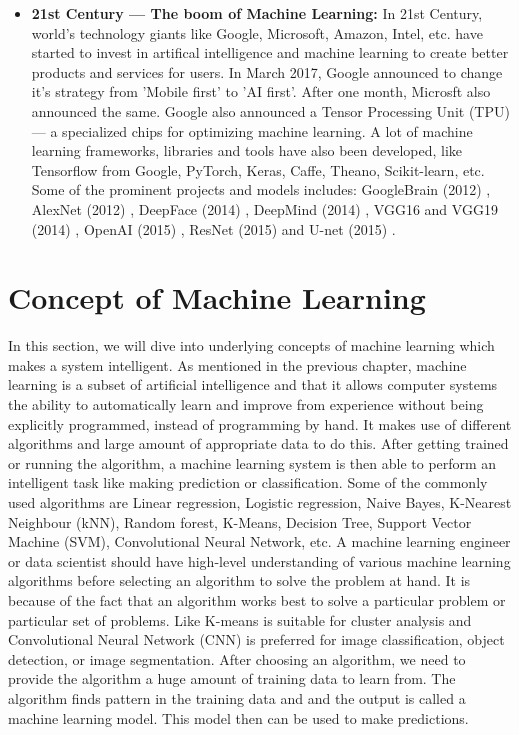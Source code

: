 \begin{itemize}
  \item  \textbf{21st Century — The boom of Machine Learning:} In 21st Century, world's technology giants like Google, Microsoft, Amazon, Intel, etc. have started to invest in artifical intelligence and machine learning to create better products and services for users. In March 2017, Google announced to change it's strategy from 'Mobile first' to 'AI first'. After one month, Microsft also announced the same. Google also announced a Tensor Processing Unit (TPU) — a specialized chips for optimizing machine learning. A lot of machine learning frameworks, libraries and tools have also been developed, like Tensorflow from Google, PyTorch, Keras, Caffe, Theano, Scikit-learn, etc. Some of the prominent projects and models includes: GoogleBrain (2012) \cite{googlebrain}, AlexNet (2012) \cite{alexnet}, DeepFace (2014) \cite{deepface}, DeepMind (2014) \cite{deepmind}, VGG16 and VGG19  (2014) \cite{vgg_19}, OpenAI (2015) \cite{openai}, ResNet (2015) \cite{resnet} and U-net (2015) \cite{unet}.
\end{itemize}

\section{Concept of Machine Learning}
In this section, we will dive into underlying concepts of machine learning which makes a system intelligent. As mentioned in the previous chapter, machine learning is a subset of artificial intelligence and that it allows computer systems the ability to automatically learn and improve from experience without being explicitly programmed, instead of programming by hand. It makes use of different algorithms and large amount of appropriate data to do this. After getting trained or running the algorithm, a machine learning system is then able to perform an intelligent task like making prediction or classification. Some of the commonly used algorithms are Linear regression, Logistic regression, Naive Bayes, K-Nearest Neighbour (kNN), Random forest, K-Means, Decision Tree, Support Vector Machine (SVM), Convolutional Neural Network, etc. A machine learning engineer or data scientist should have high-level understanding of various machine learning algorithms before selecting an algorithm to solve the problem at hand. It is because of the fact that an algorithm works best to solve a particular problem or particular set of problems. Like K-means is suitable for cluster analysis and Convolutional Neural Network (CNN) is preferred for image classification, object detection, or image segmentation. After choosing an algorithm, we need to provide the algorithm a huge amount of training data to learn from. The algorithm finds pattern in the training data and and the output is called a machine learning model. This model then can be used to make predictions.

